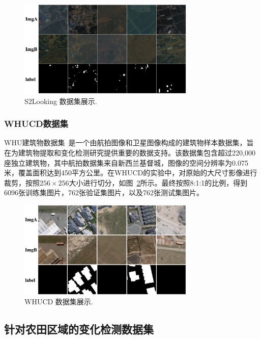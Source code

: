 \begin{figure}[!htbp]
  \centering
  \includegraphics[width=0.75\textwidth]{paper_figures/变化检测任务与实验方法介绍/s2looking.png}
  \caption{S2Looking 数据集展示.}
  \label{fig:s2looking}
\end{figure}


\subsubsection{WHUCD数据集}
WHU建筑物数据集~\cite{Ji2019FullyCN}是一个由航拍图像和卫星图像构成的建筑物样本数据集，旨在为建筑物提取和变化检测研究提供重要的数据支持。该数据集包含超过220,000座独立建筑物，其中航拍数据集来自新西兰基督城，图像的空间分辨率为0.075米，覆盖面积达到450平方公里。在WHUCD的实验中，对原始的大尺寸影像进行裁剪，按照$256 \times 256$大小进行切分，如图~\ref{fig:whucd}所示。最终按照8:1:1的比例，得到6096张训练集图片，762张验证集图片，以及762张测试集图片。


\begin{figure}[!htbp]
  \centering
  \includegraphics[width=0.75\textwidth]{paper_figures/变化检测任务与实验方法介绍/whucd.png}
  \caption{WHUCD 数据集展示.}
  \label{fig:whucd}
\end{figure}

\subsection{针对农田区域的变化检测数据集}
